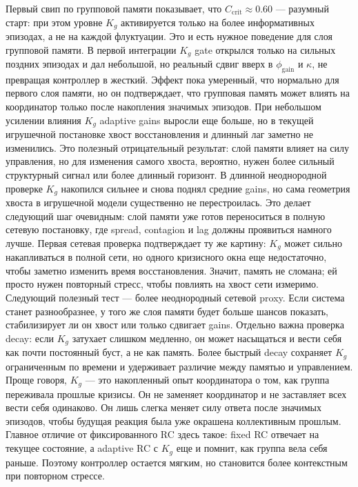 ﻿\documentclass[12pt,a4paper]{article}
\begin{document}
Первый свип по групповой памяти показывает, что $C_{\mathrm{crit}}\approx 0.60$ — разумный старт: при этом уровне $K_g$ активируется только на более информативных эпизодах, а не на каждой флуктуации. Это и есть нужное поведение для слоя групповой памяти.
В первой интеграции $K_g$ gate открылся только на сильных поздних эпизодах и дал небольшой, но реальный сдвиг вверх в $\phi_{\mathrm{gain}}$ и $\kappa$, не превращая контроллер в жесткий. Эффект пока умеренный, что нормально для первого слоя памяти, но он подтверждает, что групповая память может влиять на координатор только после накопления значимых эпизодов.
При небольшом усилении влияния $K_g$ adaptive gains выросли еще больше, но в текущей игрушечной постановке хвост восстановления и длинный лаг заметно не изменились. Это полезный отрицательный результат: слой памяти влияет на силу управления, но для изменения самого хвоста, вероятно, нужен более сильный структурный сигнал или более длинный горизонт.
В длинной неоднородной проверке $K_g$ накопился сильнее и снова поднял средние gains, но сама геометрия хвоста в игрушечной модели существенно не перестроилась. Это делает следующий шаг очевидным: слой памяти уже готов переноситься в полную сетевую постановку, где spread, contagion и lag должны проявиться намного лучше.
Первая сетевая проверка подтверждает ту же картину: $K_g$ может сильно накапливаться в полной сети, но одного кризисного окна еще недостаточно, чтобы заметно изменить время восстановления. Значит, память не сломана; ей просто нужен повторный стресс, чтобы повлиять на хвост сети измеримо.
Следующий полезный тест — более неоднородный сетевой proxy. Если система станет разнообразнее, у того же слоя памяти будет больше шансов показать, стабилизирует ли он хвост или только сдвигает gains.
Отдельно важна проверка decay: если $K_g$ затухает слишком медленно, он может насыщаться и вести себя как почти постоянный буст, а не как память. Более быстрый decay сохраняет $K_g$ ограниченным по времени и удерживает различие между памятью и управлением.
Проще говоря, $K_g$ — это накопленный опыт координатора о том, как группа переживала прошлые кризисы. Он не заменяет координатор и не заставляет всех вести себя одинаково. Он лишь слегка меняет силу ответа после значимых эпизодов, чтобы будущая реакция была уже окрашена коллективным прошлым.
Главное отличие от фиксированного RC здесь такое: fixed RC отвечает на текущее состояние, а adaptive RC с $K_g$ еще и помнит, как группа вела себя раньше. Поэтому контроллер остается мягким, но становится более контекстным при повторном стрессе.
\end{document}
